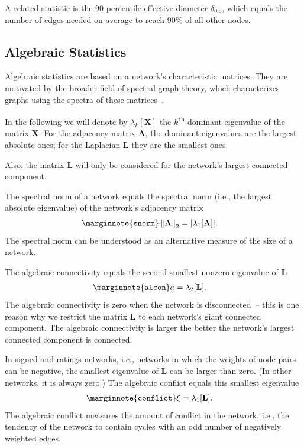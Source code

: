 \documentclass{article}
\begin{document}
A related statistic is the 90-percentile effective diameter
$\delta_{0.9}$, which equals the number of edges needed on average to
reach 90\% of all other nodes.

\subsection{Algebraic Statistics}

Algebraic statistics are based on a network's characteristic matrices.
They are motivated by the broader field of spectral graph theory, which
characterizes graphs using the spectra of these matrices~\cite{b285}.

In the following we will denote by $\lambda_k[\mathbf X]$ the
$k$\textsuperscript{th} dominant eigenvalue of the matrix $\mathbf X$.
For the adjacency matrix $\mathbf A$, the dominant eigenvalues are the
largest absolute ones; for the Laplacian $\mathbf L$ they are the
smallest ones.

Also, the matrix $\mathbf L$ will only be considered for the network's
largest connected component.

The spectral norm of a network equals the spectral norm (i.e., the
largest absolute eigenvalue) of the network's adjacency matrix
\begin{align}
  \marginnote{\texttt{snorm}} 
  \left\| \mathbf A \right\|_2
  &= 
  | \lambda_1[\mathbf A] | .
\end{align}
The spectral norm can be understood as an alternative measure of the
size of a network.

The algebraic connectivity equals the second smallest nonzero eigenvalue
of $\mathbf L$~\cite{b652}
\begin{align}
  \marginnote{\texttt{alcon}} a &= \lambda_2[\mathbf L].
\end{align}
The algebraic connectivity is zero when the network is disconnected~--
this is one reason why we restrict the matrix $\mathbf L$ to each
network's giant connected component.  The algebraic connectivity is
larger the better the network's largest connected component is
connected.

In signed and ratings networks, i.e., networks in which the weights of
node pairs can be negative, the smallest eigenvalue of $\mathbf L$ can
be larger than zero.  (In other networks, it is always zero.) The
algebraic conflict equals this smallest eigenvalue
\begin{align}
  \marginnote{\texttt{conflict}} \xi &= \lambda_1[\mathbf L].
\end{align}
The algebraic conflict measures the amount of conflict in the network,
i.e., the tendency of the network to contain cycles with an odd number
of negatively weighted edges.
\end{document}
